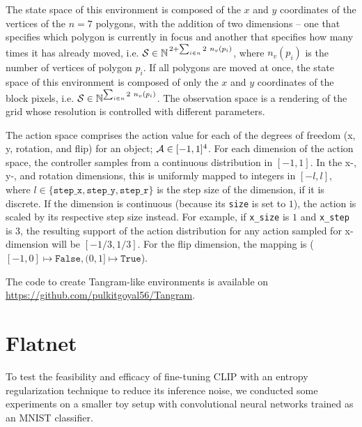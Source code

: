 The state space of this environment is composed of the \(x\) and \(y\) coordinates of the vertices of the \(n = 7\) polygons, with the addition of two dimensions -- one that specifies which polygon is currently in focus and another that specifies how many times it has already moved, i.e. \(\mathcal{S} \in \mathbb{N}^{\,2 + \sum_{i \in n} 2\ n_v(p_i)}\), where \(n_v(p_i)\) is the number of vertices of polygon \(p_i\).
If all polygons are moved at once, the state space of this environment is composed of only the \(x\) and \(y\) coordinates of the block pixels, i.e. \(\mathcal{S} \in \mathbb{N}^{\sum_{i \in n} 2\ n_v(p_i)}\).
The observation space is a rendering of the grid whose resolution is controlled with different parameters.

The action space comprises the action value for each of the degrees of freedom (x, y, rotation, and flip) for an object; \(\mathcal{A} \in [-1, 1]^4\).
For each dimension of the action space, the controller samples from a continuous distribution in \([-1, 1]\).
In the x-, y-, and rotation dimensions, this is uniformly mapped to integers in \([-l, l]\), where \(l \in \{\texttt{step\_x}, \texttt{step\_y}, \texttt{step\_r}\}\) is the step size of the dimension, if it is discrete.
If the dimension is continuous (because its \texttt{size} is set to \(1\)), the action is scaled by its respective step size instead.
For example, if \texttt{x\_size} is \(1\) and \texttt{x\_step} is \(3\), the resulting support of the action distribution for any action sampled for x-dimension will be \([-1/3, 1/3]\).
For the flip dimension, the mapping is (\([-1, 0] \mapsto \texttt{False}, (0, 1] \mapsto \texttt{True}\)).

The code to create Tangram-like environments is available on \url{https://github.com/pulkitgoyal56/Tangram}.


\chapter{Flatnet}
\label{sec:flatnet}
To test the feasibility and efficacy of fine-tuning CLIP with an entropy regularization technique to reduce its inference noise, we conducted some experiments on a smaller toy setup with convolutional neural networks trained as an MNIST classifier.




